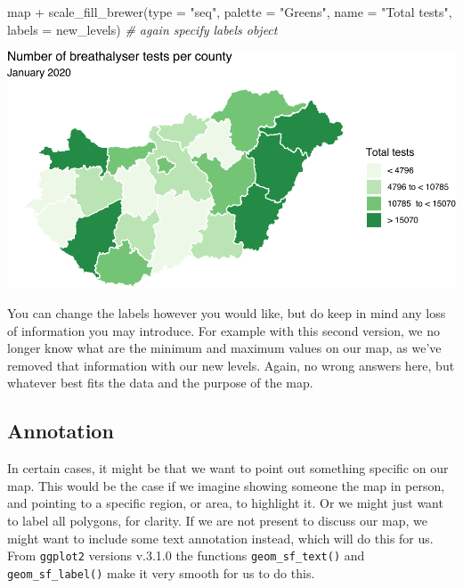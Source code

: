 \documentclass[
  krantz2]{krantz}
\makeatletter
\newenvironment{Shaded}{\begin{snugshade}}{\end{snugshade}}
\newcommand{\AttributeTok}[1]{\textcolor[rgb]{0.61,0.61,0.61}{#1}}
\newcommand{\CommentTok}[1]{\textcolor[rgb]{0.37,0.37,0.37}{\textit{#1}}}
\newcommand{\FunctionTok}[1]{\textcolor[rgb]{0,0,0}{#1}}
\newcommand{\NormalTok}[1]{#1}
\newcommand{\SpecialCharTok}[1]{\textcolor[rgb]{0,0,0}{#1}}
\newcommand{\StringTok}[1]{\textcolor[rgb]{0.5,0.5,0.5}{#1}}
\newenvironment{kframe}{%
\medskip{}
\setlength{\fboxsep}{.8em}
 \def\at@end@of@kframe{}%
 \ifinner\ifhmode%
  \def\at@end@of@kframe{\end{minipage}}%
  \begin{minipage}{\columnwidth}%
 \fi\fi%
 \def\FrameCommand##1{\hskip\@totalleftmargin \hskip-\fboxsep
 \colorbox{shadecolor}{##1}\hskip-\fboxsep
     \hskip-\linewidth \hskip-\@totalleftmargin \hskip\columnwidth}%
 \MakeFramed {\advance\hsize-\width
   \@totalleftmargin\z@ \linewidth\hsize
   \@setminipage}}%
 {\par\unskip\endMakeFramed%
 \at@end@of@kframe}
\renewenvironment{Shaded}{\begin{kframe}}{\end{kframe}}
\makeatother
\begin{document}
\begin{Shaded}
\begin{Highlighting}[]
\NormalTok{map }\SpecialCharTok{+} 
  \FunctionTok{scale\_fill\_brewer}\NormalTok{(}\AttributeTok{type =} \StringTok{"seq"}\NormalTok{, }\AttributeTok{palette =} \StringTok{"Greens"}\NormalTok{, }
                    \AttributeTok{name =} \StringTok{"Total tests"}\NormalTok{, }
                    \AttributeTok{labels =}\NormalTok{ new\_levels) }\CommentTok{\# again specify labels object}
\end{Highlighting}
\end{Shaded}

\includegraphics{crime_mapping_files/figure-latex/newnewlabelsplot-1.pdf}

You can change the labels however you would like, but do keep in mind any loss of information you may introduce. For example with this second version, we no longer know what are the minimum and maximum values on our map, as we've removed that information with our new levels. Again, no wrong answers here, but whatever best fits the data and the purpose of the map.

\hypertarget{annotation}{%
\subsection{Annotation}\label{annotation}}

In certain cases, it might be that we want to point out something specific on our map. This would be the case if we imagine showing someone the map in person, and pointing to a specific region, or area, to highlight it. Or we might just want to label all polygons, for clarity. If we are not present to discuss our map, we might want to include some text annotation instead, which will do this for us. From \texttt{ggplot2} versions v.3.1.0 the functions \texttt{geom\_sf\_text()} and \texttt{geom\_sf\_label()} make it very smooth for us to do this.
\end{document}
